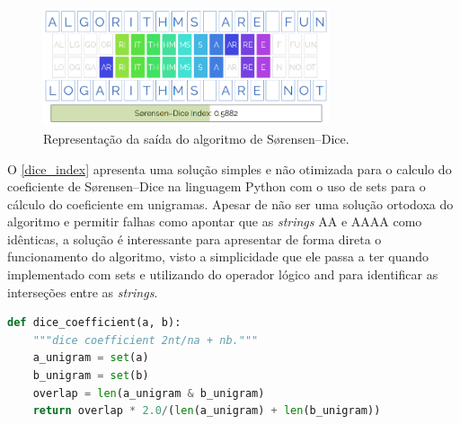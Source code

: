 \begin{figure}[h]
  \centering
  \includegraphics[width=0.75\textwidth]{figuras/dice}
  \caption{Representação da saída do algoritmo de Sørensen–Dice\protect\footnotemark.}
  \label{fig:dice_example}
\end{figure}

O \autoref{dice_index} apresenta uma solução simples e não otimizada para o calculo do coeficiente de Sørensen–Dice na linguagem Python com o uso de {\code sets} para o cálculo do coeficiente em unigramas. Apesar de não ser uma solução ortodoxa do algoritmo e permitir falhas como apontar que as \textit{strings} {\code AA} e {\code AAAA} como idênticas, a solução é interessante para apresentar de forma direta o funcionamento do algoritmo, visto a simplicidade que ele passa a ter quando implementado com {\code sets} e utilizando do operador lógico {\code and} para identificar as interseções entre as \textit{strings}.

\begin{lstlisting}[language=Python,label=dice_index,caption={Simples implementação do coeficiente de Sørensen–Dice}]
def dice_coefficient(a, b):
    """dice coefficient 2nt/na + nb."""
    a_unigram = set(a)
    b_unigram = set(b)
    overlap = len(a_unigram & b_unigram)
    return overlap * 2.0/(len(a_unigram) + len(b_unigram))
\end{lstlisting}


